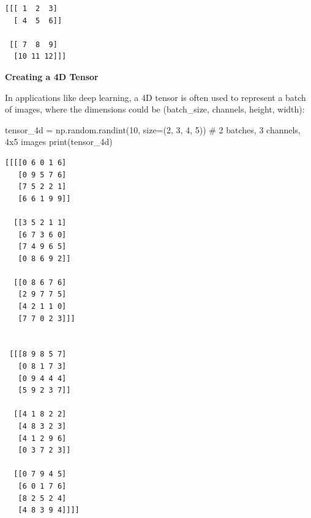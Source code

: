 \documentclass[
  letterpaper,
  DIV=11,
  numbers=noendperiod]{scrreprt}
\newenvironment{Shaded}{\begin{snugshade}}{\end{snugshade}}
\newcommand{\BuiltInTok}[1]{\textcolor[rgb]{0.00,0.23,0.31}{#1}}
\newcommand{\CommentTok}[1]{\textcolor[rgb]{0.37,0.37,0.37}{#1}}
\newcommand{\DecValTok}[1]{\textcolor[rgb]{0.68,0.00,0.00}{#1}}
\newcommand{\NormalTok}[1]{\textcolor[rgb]{0.00,0.23,0.31}{#1}}
\newcommand{\OperatorTok}[1]{\textcolor[rgb]{0.37,0.37,0.37}{#1}}
\theoremstyle{plain}
\theoremstyle{definition}
\theoremstyle{remark}
\begin{document}
\begin{verbatim}
[[[ 1  2  3]
  [ 4  5  6]]

 [[ 7  8  9]
  [10 11 12]]]
\end{verbatim}

\textbf{Creating a 4D Tensor}

In applications like deep learning, a 4D tensor is often used to
represent a batch of images, where the dimensions could be (batch\_size,
channels, height, width):

\begin{Shaded}
\begin{Highlighting}[]
\NormalTok{tensor\_4d }\OperatorTok{=}\NormalTok{ np.random.randint(}\DecValTok{10}\NormalTok{, size}\OperatorTok{=}\NormalTok{(}\DecValTok{2}\NormalTok{, }\DecValTok{3}\NormalTok{, }\DecValTok{4}\NormalTok{, }\DecValTok{5}\NormalTok{))  }\CommentTok{\# 2 batches, 3 channels, 4x5 images}
\BuiltInTok{print}\NormalTok{(tensor\_4d)}
\end{Highlighting}
\end{Shaded}

\begin{verbatim}
[[[[0 6 0 1 6]
   [0 9 5 7 6]
   [7 5 2 2 1]
   [6 6 1 9 9]]

  [[3 5 2 1 1]
   [6 7 3 6 0]
   [7 4 9 6 5]
   [0 8 6 9 2]]

  [[0 8 6 7 6]
   [2 9 7 7 5]
   [4 2 1 1 0]
   [7 7 0 2 3]]]


 [[[8 9 8 5 7]
   [0 8 1 7 3]
   [0 9 4 4 4]
   [5 9 2 3 7]]

  [[4 1 8 2 2]
   [4 8 3 2 3]
   [4 1 2 9 6]
   [0 3 7 2 3]]

  [[0 7 9 4 5]
   [6 0 1 7 6]
   [8 2 5 2 4]
   [4 8 3 9 4]]]]
\end{verbatim}
\end{document}
